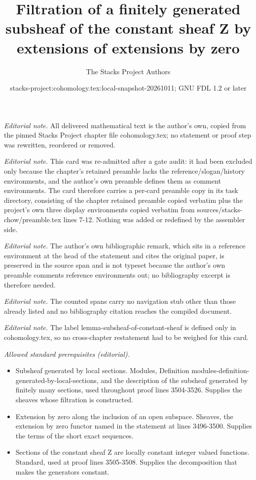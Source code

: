 \documentclass[10pt,a4paper]{amsart}
\title{Filtration of a finitely generated subsheaf of the constant sheaf Z by extensions of extensions by zero}
\author{The Stacks Project Authors}
\date{stacks-project:cohomology.tex:local-snapshot-20261011; GNU FDL 1.2 or later}
\theoremstyle{plain}
\theoremstyle{definition}
\theoremstyle{remark}
\numberwithin{equation}{subsection}
\begin{document}
\maketitle
\noindent\textit{Editorial note.} All delivered mathematical text is the author's own, copied from the pinned Stacks Project chapter file cohomology.tex; no statement or proof step was rewritten, reordered or removed.\par\medskip
\noindent\textit{Editorial note.} This card was re-admitted after a gate audit: it had been excluded only because the chapter's retained preamble lacks the reference/slogan/history environments, and the author's own preamble defines them as comment environments. The card therefore carries a per-card preamble copy in its task directory, consisting of the chapter retained preamble copied verbatim plus the project's own three display environments copied verbatim from sources/stacks-chow/preamble.tex lines 7-12. Nothing was added or redefined by the assembler side.\par\medskip
\noindent\textit{Editorial note.} The author's own bibliographic remark, which sits in a reference environment at the head of the statement and cites the original paper, is preserved in the source span and is not typeset because the author's own preamble comments reference environments out; no bibliography excerpt is therefore needed.\par\medskip
\noindent\textit{Editorial note.} The counted spans carry no navigation stub other than those already listed and no bibliography citation reaches the compiled document.\par\medskip
\noindent\textit{Editorial note.} The label lemma-subsheaf-of-constant-sheaf is defined only in cohomology.tex, so no cross-chapter restatement had to be weighed for this card.\par\medskip
\noindent\textit{Allowed standard prerequisites (editorial).}\begin{itemize}
\item Subsheaf generated by local sections. Modules, Definition modules-definition-generated-by-local-sections, and the description of the subsheaf generated by finitely many sections, used throughout proof lines 3504-3526. Supplies the sheaves whose filtration is constructed.
\item Extension by zero along the inclusion of an open subspace. Sheaves, the extension by zero functor named in the statement at lines 3496-3500. Supplies the terms of the short exact sequences.
\item Sections of the constant sheaf Z are locally constant integer valued functions. Standard, used at proof lines 3505-3508. Supplies the decomposition that makes the generators constant.
\end{itemize}\medskip
\end{document}
